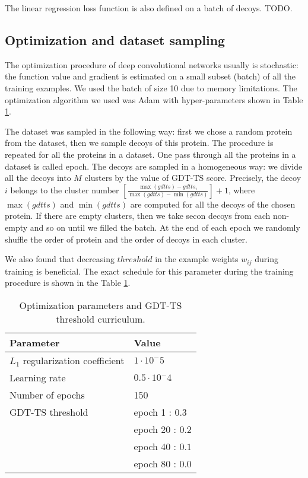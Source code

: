 \documentclass[a4paper,10pt]{article}
\begin{document}
The linear regression loss function is also defined on a batch of decoys. TODO.

\subsection{Optimization and dataset sampling}
The optimization procedure of deep convolutional networks usually is stochastic: the function value and gradient is estimated on a small subset (batch) of all the training 
examples. We used the batch of size 10 due to memory limitations. The optimization algorithm we used was Adam \cite{} with hyper-parameters shown in Table \ref{Tbl:optParams}. 

The dataset was sampled in the following way: first we chose a random protein from the dataset, then we sample decoys of this protein. The procedure is repeated for all the 
proteins in a dataset. One pass through all the proteins in a dataset is called epoch. 
The decoys are sampled in a homogeneous way: we divide all the decoys into $M$ clusters by the value of GDT-TS score. Precisely, the decoy $i$ belongs to the cluster  
number $ \left[ \frac{\max(gdtts) - gdtts_i}{\max(gdtts) - \min(gdtts)} \right] + 1$, where $\max(gdtts)$ and $\min(gdtts)$ are computed for all the decoys of 
the chosen protein. If there are empty clusters, then we take secon decoys from each non-empty and so on until we filled the batch. At the end of each epoch we randomly
shuffle the order of protein and the order of decoys in each cluster.

We also found that decreasing $threshold$ in the example weights $w_{ij}$ during training is beneficial. The exact schedule for this parameter during the training procedure 
is shown in the Table \ref{Tbl:optParams}.

\begin{table}[H]
\begin{center}
\begin{tabular}{ l | l }
    
    Parameter & Value \\
    \hline
    $L_1$ regularization coefficient & $1 \cdot 10^-5$ \\ \hline
    Learning rate & $0.5 \cdot 10^-4$ \\ \hline
    Number of epochs & 150 \\ \hline
    GDT-TS threshold & epoch 1 : $0.3$ \\ 
                     & epoch 20 : $0.2$ \\ 
                     & epoch 40 : $0.1$ \\ 
                     & epoch 80 : $0.0$ \\ \hline
\end{tabular}
    
    \caption {Optimization parameters and GDT-TS threshold curriculum.}
    \label{Tbl:optParams}
\end{center}
\end{table}
\end{document}
